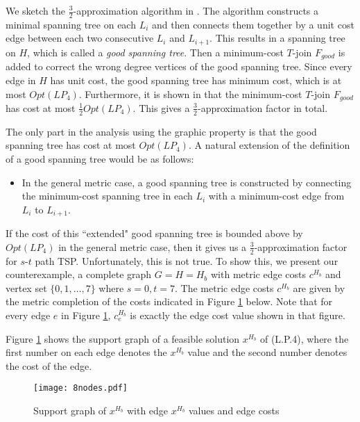 \documentclass[11pt]{article}
\begin{document}
We sketch the $\frac{3}{2}$-approximation algorithm in \cite{Gao13}. The algorithm constructs a minimal spanning tree on each $L_i$ and then connects them together by a unit cost edge between each two consecutive $L_i$ and $L_{i+1}$. This results in a spanning tree on $H$, which is called a \emph{good spanning tree}. Then a minimum-cost $T$-join $F_{good}$ is added to correct the wrong degree vertices of the good spanning tree. Since every edge in $H$ has unit cost, the good spanning tree has minimum cost, which is at most $Opt(LP_4)$. Furthermore, it is shown in \cite{Gao13} that the minimum-cost $T$-join $F_{good}$ has cost at most $\frac{1}{2}Opt(LP_4)$. This gives a $\frac{3}{2}$-approximation factor in total.

The only part in the analysis using the graphic property is
that the good spanning tree has cost at most $Opt(LP_4)$. A natural extension of the definition of a good spanning tree would be as follows:
\begin{itemize}
\item In the general metric case, a good spanning tree is constructed by connecting the minimum-cost spanning tree in each $L_i$ with a minimum-cost edge from $L_{i}$ to $L_{i+1}$.
\end{itemize}
If the cost of this ``extended" good spanning tree is bounded above by $Opt(LP_4)$ in the general metric case,
then it gives us a $\frac{3}{2}$-approximation factor for $s$-$t$ path TSP.
Unfortunately, this is not true. To show this, we present our counterexample, a complete graph $G=H=H_b$
with metric edge costs $c^{H_b}$ and vertex set $\{0, 1, \ldots, 7\}$ where $s=0, t=7$. The metric edge costs $c^{H_b}$ are given by the metric completion of the costs indicated in Figure \ref{optSoln} below. Note that for every edge $e$ in Figure \ref{optSoln}, $c^{H_b}_e$ is exactly the edge cost value shown in that figure.

Figure \ref{optSoln} shows the support graph of a feasible solution $x^{H_b}$ of (L.P.4),
where the first number on each edge denotes the $x^{H_b}$ value and the second number denotes the cost of the edge.

\begin{figure}[h]
\begin{center}
\texttt{[image: 8nodes.pdf]}\\
  \caption{Support graph of $x^{H_b}$ with edge $x^{H_b}$ values and edge costs}
  \label{optSoln}
\end{center}
\end{figure}
\end{document}
